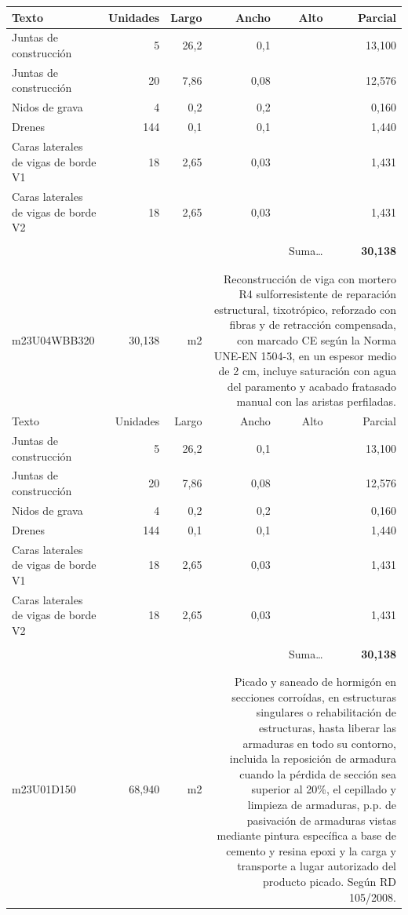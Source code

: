 \documentclass{book}%
\begin{document}
\begin{longtable}{lrrrrr}
Texto&Unidades&Largo&Ancho&Alto&Parcial\\%
\hline%
\multicolumn{1}{p{3.5cm}}{Juntas de construcción}&5&26,2&0,1&&    13,100\\%
\multicolumn{1}{p{3.5cm}}{Juntas de construcción}&20&7,86&0,08&&    12,576\\%
\multicolumn{1}{p{3.5cm}}{Nidos de grava}&4&0,2&0,2&&     0,160\\%
\multicolumn{1}{p{3.5cm}}{Drenes}&144&0,1&0,1&&     1,440\\%
\multicolumn{1}{p{3.5cm}}{Caras laterales de vigas de borde V1}&18&2,65&0,03&&     1,431\\%
\multicolumn{1}{p{3.5cm}}{Caras laterales de vigas de borde V2}&18&2,65&0,03&&     1,431\\%
&&&&&\\%
\multicolumn{5}{r}{Suma\ldots}&\textbf{    30,138}\\%
\hline%
&&&&&\\%
&&&&&\\%
m23U04WBB320&    30,138& m2&\multicolumn{3}{p{6cm}}{\scriptsize Reconstrucción de viga con mortero R4 sulforresistente de reparación estructural, tixotrópico, reforzado con fibras y de retracción compensada, con marcado CE según la Norma UNE-EN 1504-3, en un espesor medio de 2 cm, incluye saturación con agua del paramento y acabado fratasado manual con las aristas perfiladas.\normalsize}\\%
Texto&Unidades&Largo&Ancho&Alto&Parcial\\%
\hline%
\multicolumn{1}{p{3.5cm}}{Juntas de construcción}&5&26,2&0,1&&    13,100\\%
\multicolumn{1}{p{3.5cm}}{Juntas de construcción}&20&7,86&0,08&&    12,576\\%
\multicolumn{1}{p{3.5cm}}{Nidos de grava}&4&0,2&0,2&&     0,160\\%
\multicolumn{1}{p{3.5cm}}{Drenes}&144&0,1&0,1&&     1,440\\%
\multicolumn{1}{p{3.5cm}}{Caras laterales de vigas de borde V1}&18&2,65&0,03&&     1,431\\%
\multicolumn{1}{p{3.5cm}}{Caras laterales de vigas de borde V2}&18&2,65&0,03&&     1,431\\%
&&&&&\\%
\multicolumn{5}{r}{Suma\ldots}&\textbf{    30,138}\\%
\hline%
&&&&&\\%
&&&&&\\%
m23U01D150&    68,940& m2&\multicolumn{3}{p{6cm}}{\scriptsize Picado y saneado de hormigón en secciones corroídas, en estructuras singulares o rehabilitación de estructuras, hasta liberar las armaduras en todo su contorno, incluida la reposición de armadura cuando la pérdida de sección sea superior al 20\%, el cepillado y limpieza de armaduras, p.p. de pasivación de armaduras vistas mediante pintura específica a base de cemento y resina epoxi y la carga y transporte a lugar autorizado del producto picado. Según RD 105/2008.\normalsize}\\%

\end{longtable}
\end{document}
